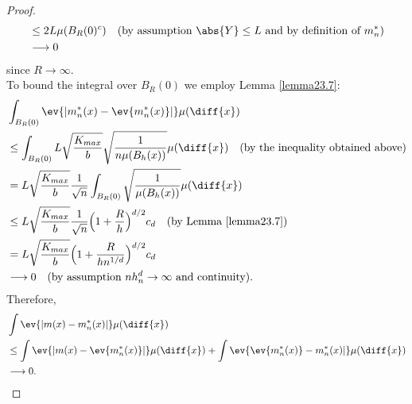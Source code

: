 \begin{proof}
\begin{align*}
        &\leq 2L \mu(B_R(0)^c) \quad\text{(by assumption $\abs{Y}\leq L$ and by definition of $m_n^*$)}\\
        &\longrightarrow 0
    \end{align*}
    since $R \rightarrow \infty$.\\
    To bound the integral over $B_R(0)$ we employ Lemma \ref{lemma23.7}:
    \begin{align*}
        &\int_{B_R(0)} \ev{|m_n^*(x)-\ev{m_n^*(x)}|} \mu(\diff{x}) \\
        &\leq \int_{B_R(0)} L \sqrt{\frac{K_{max}}{b}} \sqrt{\frac{1}{n\mu (B_h(x))}} \mu(\diff{x}) \quad\text{(by the inequality obtained above)} \\
        &= L \sqrt{\frac{K_{max}}{b}} \frac{1}{\sqrt{n}} \int_{B_R(0)} \sqrt{\frac{1}{\mu (B_h(x))}} \mu(\diff{x}) \\
        &\leq L \sqrt{\frac{K_{max}}{b}} \frac{1}{\sqrt{n}} \Bigl(1+\frac{R}{h}\Bigr)^{d/2} c_d \quad\text{(by Lemma \ref{lemma23.7})} \\
        &= L \sqrt{\frac{K_{max}}{b}} \Bigl(1+\frac{R}{hn^{1/d}}\Bigr)^{d/2} c_d \\
        &\longrightarrow 0 \quad\text{(by assumption $nh_n^d \rightarrow \infty$ and continuity)}.
    \end{align*}
    Therefore,
    \begin{align*}
        &\int \ev{|m(x)-m_n^*(x)|}\mu(\diff{x}) \\
        &\leq \int \ev{|m(x)-\ev{m_n^*(x)}|}\mu(\diff{x}) + \int \ev{\ev{m_n^*(x)}-m_n^*(x)|}\mu(\diff{x}) \\
        &\longrightarrow 0.
    \end{align*}
\end{proof}

